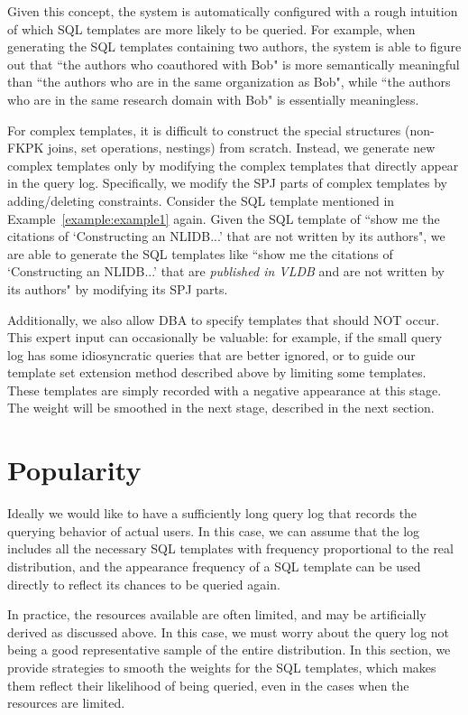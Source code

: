 \documentclass{vldb}
\begin{document}
Given this concept, the system is automatically configured with a rough intuition of which SQL templates are more likely to be queried.  For example, when generating the SQL templates containing two authors, the system is able to figure out that ``the authors who coauthored with Bob" is more semantically meaningful than ``the authors who are in the same organization as Bob", while ``the authors who are in the same research domain with Bob" is essentially meaningless.

For complex templates, it is difficult to construct the special structures (non-FKPK joins, set operations, nestings) from scratch.  Instead, we generate new complex templates only by modifying the complex templates that directly appear in the query log.  Specifically, we modify the SPJ parts of complex templates by adding/deleting constraints.  Consider the SQL template mentioned in Example~\ref{example:example1} again.  Given the SQL template of ``show me the citations of `Constructing an NLIDB...' that are not written by its authors", we are able to generate the SQL templates like ``show me the citations of `Constructing an NLIDB...' that are \emph{published in VLDB} and are not written by its authors" by modifying its SPJ parts.  

Additionally, we also allow DBA to specify templates that should NOT occur.  This expert input can occasionally be valuable: for example, if the small query log has some idiosyncratic queries that are better ignored, or to guide our template set extension method described above by limiting some templates.  These templates are simply recorded with a negative appearance at this stage.  The weight will be smoothed in the next stage, described in the next section.

\section{Popularity}
\label{sec:modelAndPopularity}
Ideally we would like to have a sufficiently long query log that records the querying behavior of actual users.  In this case, we can assume that the log includes all the necessary SQL templates with frequency proportional to the real distribution, and the appearance frequency of a SQL template can be used directly to reflect its chances to be queried again.  

In practice, the resources available are often limited, and may be artificially derived as discussed above.  In this case, we must worry about the query log not being a good representative sample of the entire distribution.  In this section, we provide strategies to smooth the weights for the SQL templates, which makes them reflect their likelihood of being queried, even in the cases when the resources are limited. 
\end{document}
